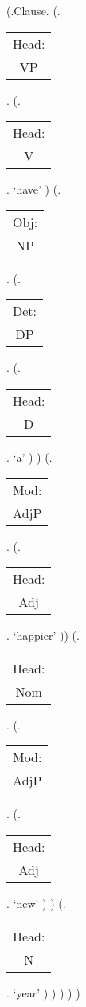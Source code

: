 \documentclass[12pt]{standalone}
\newcommand{\NL}[2]{\begin{tabular}[t]{c}\small\textsf{#1:}\\
#2\end{tabular}}
\begin{document}
\begin{parsetree}
(.Clause.
				(.\NL{Head}{VP}. 
					(.\NL{Head}{V}.  `have' )
					(.\NL{Obj}{NP}. 
						(.\NL{Det}{DP}. 
							(.\NL{Head}{D}. `a' )
						)
							(.\NL{Mod}{AdjP}. 
								(.\NL{Head}{Adj}. `happier' ))
							(.\NL{Head}{Nom}. 
								(.\NL{Mod}{AdjP}. 
									(.\NL{Head}{Adj}. `new' )
								)
								(.\NL{Head}{N}. `year' )
							)
						)
					)
				)
\end{parsetree}
\end{document}
